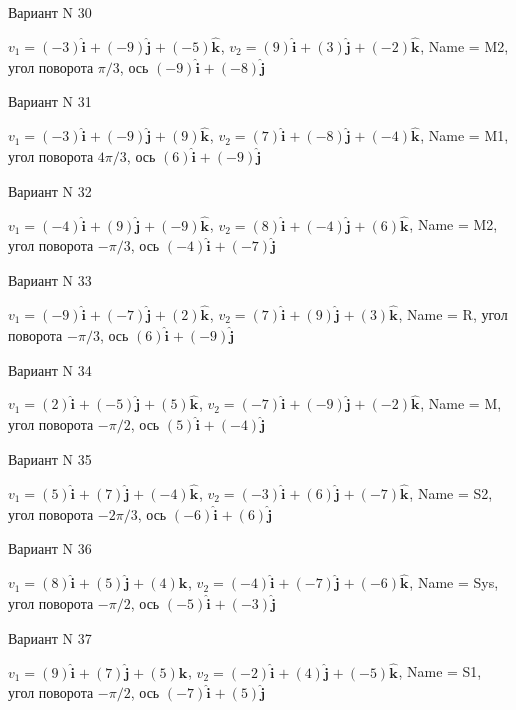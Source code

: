\documentclass[11pt]{report}
\begin{document}
Вариант N 30

$v_1 = (-3)\mathbf{\hat{i}_{}} + (-9)\mathbf{\hat{j}_{}} + (-5)\mathbf{\hat{k}_{}}$, $v_2 = (9)\mathbf{\hat{i}_{}} + (3)\mathbf{\hat{j}_{}} + (-2)\mathbf{\hat{k}_{}}$, Name = M2, угол поворота $\pi / 3$, ось $(-9)\mathbf{\hat{i}_{}} + (-8)\mathbf{\hat{j}_{}}$

Вариант N 31

$v_1 = (-3)\mathbf{\hat{i}_{}} + (-9)\mathbf{\hat{j}_{}} + (9)\mathbf{\hat{k}_{}}$, $v_2 = (7)\mathbf{\hat{i}_{}} + (-8)\mathbf{\hat{j}_{}} + (-4)\mathbf{\hat{k}_{}}$, Name = M1, угол поворота $4 \pi / 3$, ось $(6)\mathbf{\hat{i}_{}} + (-9)\mathbf{\hat{j}_{}}$

Вариант N 32

$v_1 = (-4)\mathbf{\hat{i}_{}} + (9)\mathbf{\hat{j}_{}} + (-9)\mathbf{\hat{k}_{}}$, $v_2 = (8)\mathbf{\hat{i}_{}} + (-4)\mathbf{\hat{j}_{}} + (6)\mathbf{\hat{k}_{}}$, Name = M2, угол поворота $- \pi / 3$, ось $(-4)\mathbf{\hat{i}_{}} + (-7)\mathbf{\hat{j}_{}}$

Вариант N 33

$v_1 = (-9)\mathbf{\hat{i}_{}} + (-7)\mathbf{\hat{j}_{}} + (2)\mathbf{\hat{k}_{}}$, $v_2 = (7)\mathbf{\hat{i}_{}} + (9)\mathbf{\hat{j}_{}} + (3)\mathbf{\hat{k}_{}}$, Name = R, угол поворота $- \pi / 3$, ось $(6)\mathbf{\hat{i}_{}} + (-9)\mathbf{\hat{j}_{}}$

Вариант N 34

$v_1 = (2)\mathbf{\hat{i}_{}} + (-5)\mathbf{\hat{j}_{}} + (5)\mathbf{\hat{k}_{}}$, $v_2 = (-7)\mathbf{\hat{i}_{}} + (-9)\mathbf{\hat{j}_{}} + (-2)\mathbf{\hat{k}_{}}$, Name = M, угол поворота $- \pi / 2$, ось $(5)\mathbf{\hat{i}_{}} + (-4)\mathbf{\hat{j}_{}}$

Вариант N 35

$v_1 = (5)\mathbf{\hat{i}_{}} + (7)\mathbf{\hat{j}_{}} + (-4)\mathbf{\hat{k}_{}}$, $v_2 = (-3)\mathbf{\hat{i}_{}} + (6)\mathbf{\hat{j}_{}} + (-7)\mathbf{\hat{k}_{}}$, Name = S2, угол поворота $- 2 \pi / 3$, ось $(-6)\mathbf{\hat{i}_{}} + (6)\mathbf{\hat{j}_{}}$

Вариант N 36

$v_1 = (8)\mathbf{\hat{i}_{}} + (5)\mathbf{\hat{j}_{}} + (4)\mathbf{\hat{k}_{}}$, $v_2 = (-4)\mathbf{\hat{i}_{}} + (-7)\mathbf{\hat{j}_{}} + (-6)\mathbf{\hat{k}_{}}$, Name = Sys, угол поворота $- \pi / 2$, ось $(-5)\mathbf{\hat{i}_{}} + (-3)\mathbf{\hat{j}_{}}$

Вариант N 37

$v_1 = (9)\mathbf{\hat{i}_{}} + (7)\mathbf{\hat{j}_{}} + (5)\mathbf{\hat{k}_{}}$, $v_2 = (-2)\mathbf{\hat{i}_{}} + (4)\mathbf{\hat{j}_{}} + (-5)\mathbf{\hat{k}_{}}$, Name = S1, угол поворота $- \pi / 2$, ось $(-7)\mathbf{\hat{i}_{}} + (5)\mathbf{\hat{j}_{}}$
\end{document}
